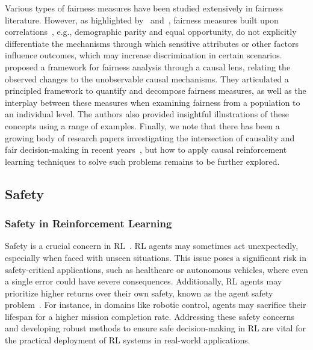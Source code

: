 \documentclass[10pt]{article} %
\theoremstyle{definition}
\begin{document}
Various types of fairness measures have been studied extensively in fairness literature. However, as highlighted by~\citet{kusnerCounterfactualFairness2017} and~\citet{zhangFairnessDecisionMakingCausal2018}, fairness measures built upon correlations~\citep{zafarFairnessConstraintsMechanisms2015,wenAlgorithmsFairnessSequential2021}, e.g., demographic parity and equal opportunity, do not explicitly differentiate the mechanisms through which sensitive attributes or other factors influence outcomes, which may increase discrimination in certain scenarios. \citet{pleckoCausalFairnessAnalysis2022} proposed a framework for fairness analysis through a causal lens, relating the observed changes to the unobservable causal mechanisms. They articulated a principled framework to quantify and decompose fairness measures, as well as the interplay between these measures when examining fairness from a population to an individual level. The authors also provided insightful illustrations of these concepts using a range of examples. Finally, we note that there has been a growing body of research papers investigating the intersection of causality and fair decision-making in recent years~\citep{nabiLearningOptimalFair2019,creagerCausalModelingFairness2020,zhangHowFairDecisions2020,tangTierBalancingDynamic2023,pleckoCausalFairnessOutcome2023}, but how to apply causal reinforcement learning techniques to solve such problems remains to be further explored.

\subsection{Safety}
\subsubsection{Safety in Reinforcement Learning}
Safety is a crucial concern in RL~\citep{garciaComprehensiveSurveySafe2015, guReviewSafeReinforcement2022}. RL agents may sometimes act unexpectedly, especially when faced with unseen situations. This issue poses a significant risk in safety-critical applications, such as healthcare or autonomous vehicles, where even a single error could have severe consequences. Additionally, RL agents may prioritize higher returns over their own safety, known as the agent safety problem~\citep{fultonSafeReinforcementLearning2018, beardSafetyVerificationAutonomous2022}. For instance, in domains like robotic control, agents may sacrifice their lifespan for a higher mission completion rate. Addressing these safety concerns and developing robust methods to ensure safe decision-making in RL are vital for the practical deployment of RL systems in real-world applications.
\end{document}
